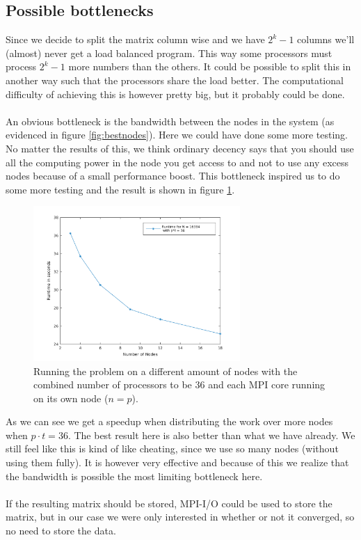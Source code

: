\subsection*{Possible bottlenecks}
Since we decide to split the matrix column wise and we have $2^k-1$ columns we'll (almost) never get a load balanced program. This way some processors must process $2^k-1$ more numbers than the others. It could be possible to split this in another way such that the processors share the load better. The computational difficulty of achieving this is however pretty big, but it probably could be done.
\\ \\
An obvious bottleneck is the bandwidth between the nodes in the system (as evidenced in figure \ref{fig:bestnodes}). Here we could have done some more testing. No matter the results of this, we think ordinary decency says that you should use all the computing power in the node you get access to and not to use any excess nodes because of a small performance boost. This bottleneck inspired us to do some more testing and the result is shown in figure \ref{fig:varynodes}.
\begin{figure}[h]
\centering
\includegraphics[width=0.7\textwidth]{./figures/varynodes}
\caption{Running the problem on a different amount of nodes with the combined number of processors to be 36 and each MPI core running on its own node ($n=p$).}
\label{fig:varynodes}
\end{figure}
As we can see we get a speedup when distributing the work over more nodes when $p\cdot t=36$. The best result here is also better than what we have already. We still feel like this is kind of like cheating, since we use so many nodes (without using them fully). It is however very effective and because of this we realize that the bandwidth is possible the most limiting bottleneck here.
\\ \\
If the resulting matrix should be stored, MPI-I/O could be used to store the matrix, but in our case we were only interested in whether or not it converged, so no need to store the data.
